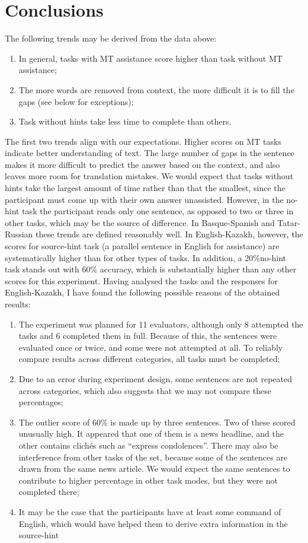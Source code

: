 \documentclass[11pt]{article}
\begin{document}
\section{Conclusions}
\label{sec:conclusion}
The following trends may be derived from the data above:
\begin{enumerate}
\item  In general, tasks with MT assistance score higher than task without MT
assistance;
\item  The more words are removed from context, the more difficult it is to fill the gaps
(see below for exceptions);
\item  Task without hints take less time to complete than others.
\end{enumerate}
The first two trends align with our expectations. Higher scores on MT tasks indicate
better understanding of text. The large number of gaps in the sentence makes it more
difficult to predict the answer based on the context, and also leaves more room for
translation mistakes. We would expect that tasks without hints take the largest amount of
time rather than that the smallest, since the participant must come up with their own
answer unassisted. However, in the no-hint task the participant reads only one sentence,
as opposed to two or three in other tasks, which may be the source of difference.
In Basque-Spanish and Tatar-Russian these trends are defined reasonably well. In
English-Kazakh, however, the scores for source-hint task (a parallel sentence in English
for assistance) are systematically higher than for other types of tasks. In addition, a 20\%no-hint task stands out with 60\% accuracy, which is substantially higher than any other
scores for this experiment.
Having analysed the tasks and the responses for English-Kazakh, I have found the
following possible reasons of the obtained results:
\begin{enumerate}
\item  The experiment was planned for 11 evaluators, although only 8 attempted the
tasks and 6 completed them in full. Because of this, the sentences were evaluated
once or twice, and some were not attempted at all. To reliably compare results
across different categories, all tasks must be completed;
\item  Due to an error during experiment design, some sentences are not repeated across
categories, which also suggests that we may not compare these percentages;
\item  The outlier score of 60\% is made up by three sentences. Two of these scored
unusually high. It appeared that one of them is a news headline, and the other
contains clich\'es such as ``express condolences''. There may also be interference
from other tasks of the set, because some of the sentences are drawn from the
same news article. We would expect the same sentences to contribute to higher
percentage in other task modes, but they were not completed there;
\item  It may be the case that the participants have at least some command of English,
which would have helped them to derive extra information in the source-hint
\end{enumerate}
\end{document}
